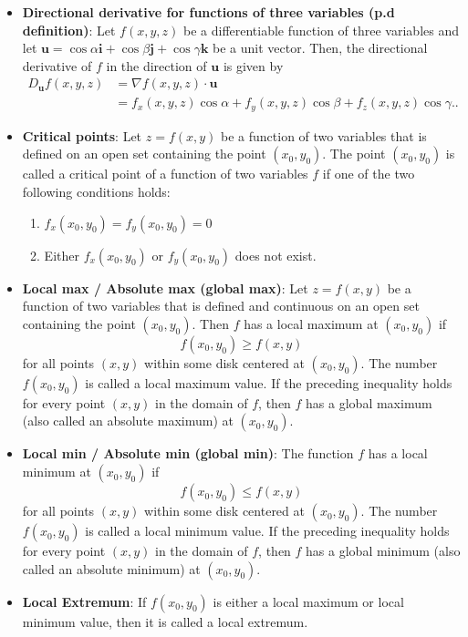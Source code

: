 \documentclass{report}
\begin{document}
\begin{itemize}
    \item \textbf{Directional derivative for functions of three variables (p.d definition)}:
        Let $f(x,y,z)$ be a differentiable function of three variables and let $\mathbf{u}=\cos\alpha\mathbf{i}+\cos\beta\mathbf{j}+\cos\gamma\mathbf{k}$ be a unit vector. Then, the directional derivative of $f$ in the direction of $\mathbf{u}$ is given by
        \begin{align*}
            D_{\mathbf{u}}f(x,y,z) &= \nabla f(x,y,z) \cdot \mathbf{u}  \\
            &= f_x(x,y,z)\cos\alpha + f_y(x,y,z)\cos\beta + f_z(x,y,z)\cos\gamma.
        .\end{align*}
    \item \textbf{Critical points}: 
        Let $z = f(x, y)$ be a function of two variables that is defined on an open set containing the point $(x_0, y_0)$. The point $(x_0, y_0)$ is called a critical point of a function of two variables $f$ if one of the two following conditions holds:
        \begin{enumerate}
            \item $f_x(x_0, y_0) = f_y(x_0, y_0) = 0$
            \item Either $f_x(x_0, y_0)$ or $f_y(x_0, y_0)$ does not exist.
        \end{enumerate}
    \item \textbf{Local max / Absolute max (global max)}:
        Let $z = f(x, y)$ be a function of two variables that is defined and continuous on an open set containing the point $(x_0, y_0)$. Then $f$ has a local maximum at $(x_0, y_0)$ if
        \[ f(x_0, y_0) \geq f(x, y) \]
        for all points $(x, y)$ within some disk centered at $(x_0, y_0)$. The number $f(x_0, y_0)$ is called a local maximum value. If the preceding inequality holds for every point $(x, y)$ in the domain of $f$, then $f$ has a global maximum (also called an absolute maximum) at $(x_0, y_0)$.
    \item \textbf{Local min / Absolute min (global min)}:
        The function $f$ has a local minimum at $(x_0, y_0)$ if
        \[ f(x_0, y_0) \leq f(x, y) \]
        for all points $(x, y)$ within some disk centered at $(x_0, y_0)$. The number $f(x_0, y_0)$ is called a local minimum value. If the preceding inequality holds for every point $(x, y)$ in the domain of $f$, then $f$ has a global minimum (also called an absolute minimum) at $(x_0, y_0)$.
    \item \textbf{Local Extremum}:
        If $f(x_0, y_0)$ is either a local maximum or local minimum value, then it is called a local extremum.

\end{itemize}
\end{document}
